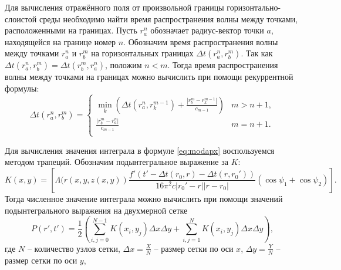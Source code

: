 \documentclass[a4paper, fontsize=14pt]{article}
\begin{document}
	Для вычисления отражённого поля от произвольной границы горизонтально-слоистой среды необходимо найти время распространения волны между точками, расположенными на границах.  Пусть $r_a^n$ обозначает радиус-вектор точки $a$, находящейся на границе номер $n$.
	Обозначим время распространения волны между точками $r_a^n$ и $r_b^m$ на горизонтальных границах $\Delta t (r_a^n,r_b^m)$.
	Так как $\Delta t (r_a^n,r_b^m) = \Delta t (r_b^m,r_a^n)$, положим $n<m$. Тогда время распространения волны между точками на границах можно вычислить при помощи рекуррентной формулы:
	$$
	\Delta t (r_a^n,r_b^m) = \begin{cases}
		\min\limits_{k} \left( \Delta t (r_a^n,r_k^{m-1}) + \frac{|r_b^m-r_k^{m-1}|}{c_{m-1}}\right) & m > n+1, \\
		\frac{|r_b^m-r_a^n|}{c_{m-1}} & m = n+1. \\
	\end{cases}
	$$
	
	Для вычисления значения интеграла в формуле  \eqref{eq:modapx} воспользуемся методом трапеций. 
	Обозначим подынтегральное выражение за $K$:
	\begin{equation}
			K(x,y) = \left[\Lambda(r(x,y,z(x,y)) \frac{f'\left(t'-\Delta t(r_0,r) - \Delta t(r,r_0')\right) }{16\pi^2c|r_0'-r||r-r_0|} (\cos \psi_1 + \cos \psi_2) \right].
	\end{equation}
	Тогда численное значение интеграла можно вычислить при помощи значений подынтегрального выражения на двухмерной сетке 
	\begin{equation}
					P(r',t')=\frac{1}{2} \left(\sum_{i,j=0}^{N-1} K(x_i,y_j) \Delta x \Delta y + \sum_{i,j=1}^{N} K(x_i,y_j) \Delta x \Delta y\right), 
	\end{equation}
	где $N$ -- количество узлов сетки,  $\Delta x = \frac{X}{N}$ -- размер сетки по оси $x$,  $\Delta y = \frac{Y}{N}$ -- размер сетки по оси $y$, 
	
\end{document}
